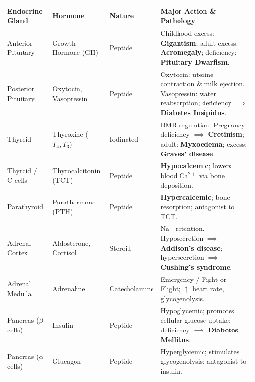 \documentclass[10pt,a4paper]{article}
\begin{document}
\begin{conceptbox}
\begin{center}
\scriptsize
\begin{tabular}{|p{2.2cm}|p{2.5cm}|p{1.8cm}|p{7.0cm}|}
\hline
\textbf{Endocrine Gland} & \textbf{Hormone} & \textbf{Nature} & \textbf{Major Action \& Pathology} \\
\hline
Anterior Pituitary & Growth Hormone (GH) & Peptide & Childhood excess: \textbf{Gigantism}; adult excess: \textbf{Acromegaly}; deficiency: \textbf{Pituitary Dwarfism}. \\
Posterior Pituitary & Oxytocin, Vasopressin & Peptide & Oxytocin: uterine contraction \& milk ejection. Vasopressin: water reabsorption; deficiency $\implies$ \textbf{Diabetes Insipidus}. \\
Thyroid & Thyroxine ($T_4, T_3$) & Iodinated & BMR regulation. Pregnancy deficiency $\implies$ \textbf{Cretinism}; adult: \textbf{Myxoedema}; excess: \textbf{Graves' disease}. \\
Thyroid / C-cells & Thyrocalcitonin (TCT) & Peptide & \textbf{Hypocalcemic}; lowers blood $\mathrm{Ca}^{2+}$ via bone deposition. \\
Parathyroid & Parathormone (PTH) & Peptide & \textbf{Hypercalcemic}; bone resorption; antagonist to TCT. \\
Adrenal Cortex & Aldosterone, Cortisol & Steroid & $\mathrm{Na}^+$ retention. Hyposecretion $\implies$ \textbf{Addison's disease}; hypersecretion $\implies$ \textbf{Cushing's syndrome}. \\
Adrenal Medulla & Adrenaline & Catecholamine & Emergency / Fight-or-Flight; $\uparrow$ heart rate, glycogenolysis. \\
Pancreas ($\beta$-cells) & Insulin & Peptide & Hypoglycemic; promotes cellular glucose uptake; deficiency $\implies$ \textbf{Diabetes Mellitus}. \\
Pancreas ($\alpha$-cells) & Glucagon & Peptide & Hyperglycemic; stimulates glycogenolysis; antagonist to insulin. \\
\hline
\end{tabular}
\end{center}
\end{conceptbox}
\end{document}
